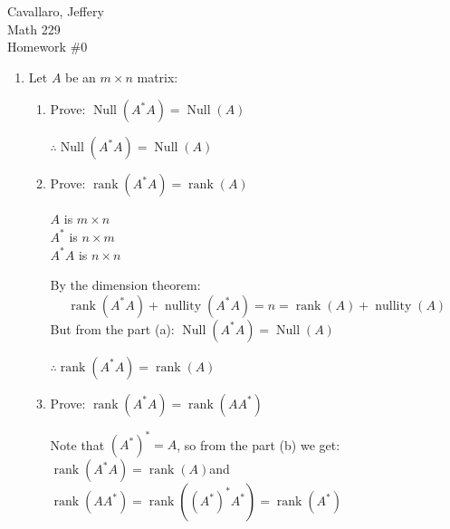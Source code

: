 \documentclass[letterpaper,12pt,fleqn]{article}
\DeclareMathOperator{\nul}{Null}
\DeclareMathOperator{\nuly}{nullity}
\DeclareMathOperator{\rank}{rank}
\newcommand{\vx}{\vec{x}}
\newcommand{\vz}{\vec{0}}
\newcommand{\conj}[1]{\overline{#1}}
\begin{document}
Cavallaro, Jeffery \\
Math 229 \\
Homework \#0

\bigskip

\begin{enumerate}
\item Let $A$ be an $m\times n$ matrix:
  \begin{enumerate}
  \item Prove: $\nul(A^*A)=\nul(A)$


    $\therefore\nul(A^*A)=\nul(A)$

  \item Prove: $\rank(A^*A)=\rank(A)$

    $A$ is $m\times n$ \\
    $A^*$ is $n\times m$ \\
    $A^*A$ is $n\times n$
    
    By the dimension theorem:
    \[\rank(A^*A)+\nuly(A^*A)=n=\rank(A)+\nuly(A)\]
    But from the part (a): $\nul(A^*A)=\nul(A)$

    $\therefore\rank(A^*A)=\rank(A)$

  \item Prove: $\rank(A^*A)=\rank(AA^*)$

    Note that $(A^*)^*=A$, so from the part (b) we get: \\
    $\rank(A^*A)=\rank(A)$\hspace{2ex}and \\
    $\rank(AA^*)=\rank((A^*)^*A^*)=\rank(A^*)$


\end{enumerate}
\end{enumerate}
\end{document}
